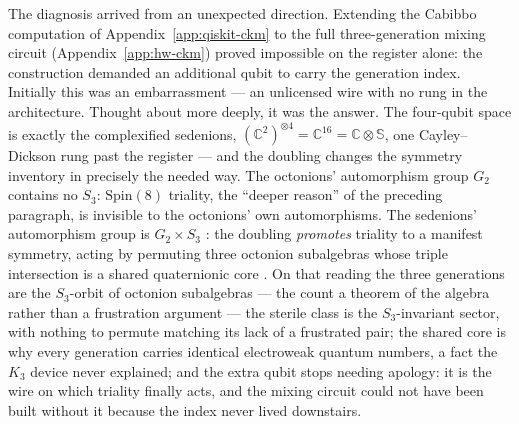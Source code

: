 The diagnosis arrived from an unexpected direction. Extending the Cabibbo computation of
Appendix~\ref{app:qiskit-ckm} to the full three-generation mixing circuit
(Appendix~\ref{app:hw-ckm}) proved impossible on the register alone: the construction demanded an
additional qubit to carry the generation index. Initially this was an embarrassment --- an
unlicensed wire with no rung in the architecture. Thought about more deeply, it was the answer.
The four-qubit space is exactly the complexified sedenions,
$(\mathbb{C}^{2})^{\otimes 4} = \mathbb{C}^{16} = \mathbb{C} \otimes \mathbb{S}$, one
Cayley--Dickson rung past the register --- and the doubling changes the symmetry inventory in
precisely the needed way. The octonions' automorphism group $G_{2}$ contains no $S_{3}$:
$\mathrm{Spin}(8)$ triality, the ``deeper reason'' of the preceding paragraph, is invisible to the
octonions' own automorphisms. The sedenions' automorphism group is $G_{2} \times S_{3}$
\autocite{brown1967generalized}: the doubling \emph{promotes} triality to a manifest symmetry,
acting by permuting three octonion subalgebras whose triple intersection is a shared quaternionic
core \autocite{gillardgresnigt2019three}. On that reading the three generations are the
$S_{3}$-orbit of octonion subalgebras --- the count a theorem of the algebra rather than a
frustration argument --- the sterile class is the $S_{3}$-invariant sector, with nothing to
permute matching its lack of a frustrated pair; the shared core is why every generation carries
identical electroweak quantum numbers, a fact the $K_{3}$ device never explained; and the extra
qubit stops needing apology: it is the wire on which triality finally acts, and the mixing circuit
could not have been built without it because the index never lived downstairs.

